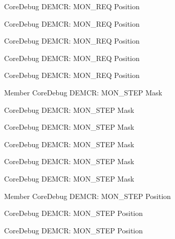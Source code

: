 \begin{DoxyRefList}
\label{deprecated__deprecated000498}%
%
Core\+Debug DEMCR\+: MON\+\_\+\+REQ Position 

\label{deprecated__deprecated000409}%
%
Core\+Debug DEMCR\+: MON\+\_\+\+REQ Position 

\label{deprecated__deprecated000600}%
%
Core\+Debug DEMCR\+: MON\+\_\+\+REQ Position 

\label{deprecated__deprecated000191}%
%
Core\+Debug DEMCR\+: MON\+\_\+\+REQ Position 

\label{deprecated__deprecated000047}%
%
Core\+Debug DEMCR\+: MON\+\_\+\+REQ Position  
\item[Member \doxylink{group__CMSIS__CoreDebug_ga2ded814556de96fc369de7ae9a7ceb98}{Core\+Debug\+\_\+\+DEMCR\+\_\+\+MON\+\_\+\+STEP\+\_\+\+Msk} ]\label{deprecated__deprecated000412}%
%
Core\+Debug DEMCR\+: MON\+\_\+\+STEP Mask 

\label{deprecated__deprecated000501}%
%
Core\+Debug DEMCR\+: MON\+\_\+\+STEP Mask 

\label{deprecated__deprecated000336}%
%
Core\+Debug DEMCR\+: MON\+\_\+\+STEP Mask 

\label{deprecated__deprecated000603}%
%
Core\+Debug DEMCR\+: MON\+\_\+\+STEP Mask 

\label{deprecated__deprecated000194}%
%
Core\+Debug DEMCR\+: MON\+\_\+\+STEP Mask 

\label{deprecated__deprecated000050}%
%
Core\+Debug DEMCR\+: MON\+\_\+\+STEP Mask  
\item[Member \doxylink{group__CMSIS__CoreDebug_ga9ae10710684e14a1a534e785ef390e1b}{Core\+Debug\+\_\+\+DEMCR\+\_\+\+MON\+\_\+\+STEP\+\_\+\+Pos} ]\label{deprecated__deprecated000602}%
%
Core\+Debug DEMCR\+: MON\+\_\+\+STEP Position 

\label{deprecated__deprecated000335}%
%
Core\+Debug DEMCR\+: MON\+\_\+\+STEP Position 

\label{deprecated__deprecated000193}%
%
Core\+Debug DEMCR\+: MON\+\_\+\+STEP Position 


\end{DoxyRefList}
